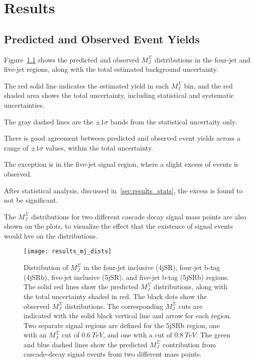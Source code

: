 \chapter{Results}\label{ch:results}

\section{Predicted and Observed Event Yields}\label{sec:results_yields}

Figure~\ref{fig:results_mj_dists} shows the predicted and observed $M_J^{\Sigma}$ distributions in the
four-jet and five-jet regions, along with the total estimated background uncertainty.

The red solid line indicates the estimated yield in each $M_J^{\Sigma}$ bin, and the red shaded area
shows the total uncertainty, including statistical and systematic uncertainties.

The gray dashed lines are the $\pm1\sigma$ bands from the statistical uncertaity only.

There is good agreement between predicted and observed event yields across a range of $\pm1\sigma$ values,
within the total uncertainty.

The exception is in the five-jet signal region, where a slight excess of events is observed.

After statistical analysis, discussed in~\ref{sec:results_stats}, the excess is found to not be significant.

The $M_J^{\Sigma}$ distributions for two different cascade decay signal mass points are also shown on the plots,
to visualize the effect that the existence of signal events would hve on the distributions.


\begin{figure}[!ht]
    \centering
\texttt{[image: results\_mj\_dists]}
\caption{Distribution of $M_J^{\Sigma}$ in the four-jet inclusive (4jSR), four-jet b-tag (4jSRb), five-jet inclusive
(5jSR), and five-jet b-tag (5jSRb) regions.
The solid red lines show the predicted $M_J^{\Sigma}$ distributions, along with the total uncertainty shaded in red.
The black dots show the observed $M_J^{\Sigma}$ distributions.
The corresponding $M_J^{\Sigma}$ cuts are indicated with the solid black vertical line and arrow for each region.
Two separate signal regions are defined for the 5jSRb region, one with an $M_J^{\Sigma}$ cut of $0.6~TeV$,
and one with a cut of $0.8~TeV$.
The green and blue dashed lines show the predicted $M_J^{\Sigma}$ contribution from cascade-decay signal events
from two different mass points.
}
\label{fig:results_mj_dists}
\end{figure}

